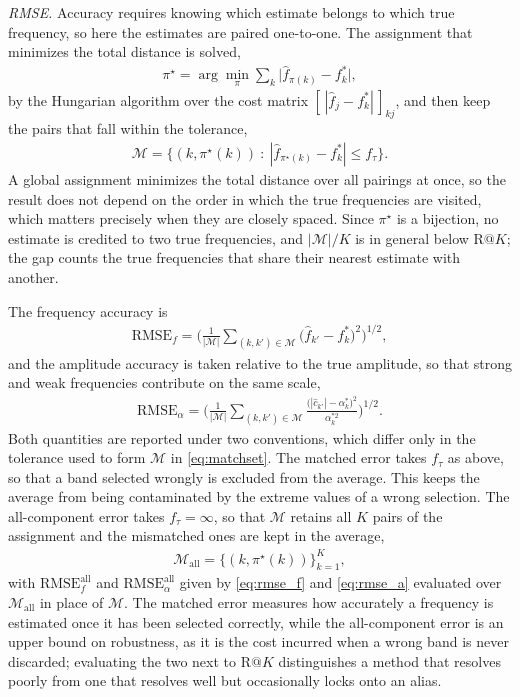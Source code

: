 \documentclass[journal,onecolumn]{IEEEtran}
\begin{document}
\emph{RMSE.} Accuracy requires knowing which estimate belongs to which true frequency, so here the estimates are paired one-to-one. The assignment that minimizes the total distance is solved,
\begin{eqnarray}
\label{eq:assign}
\pi^\star=\arg\min_{\pi}\sum_{k}\big|\hat f_{\pi(k)}-f_k^\ast\big|,
\end{eqnarray}
by the Hungarian algorithm over the cost matrix $[\,|\hat f_j-f_k^\ast|\,]_{kj}$, and then keep the pairs that fall within the tolerance,
\begin{eqnarray}
\label{eq:matchset}
\mathcal{M}=\big\{(k,\pi^\star(k))\ :\ |\hat f_{\pi^\star(k)}-f_k^\ast|\le f_{\tau}\big\}.
\end{eqnarray}
A global assignment minimizes the total distance over all pairings at once, so the result does not depend on the order in which the true frequencies are visited, which matters precisely when they are closely spaced. Since $\pi^\star$ is a bijection, no estimate is credited to two true frequencies, and $|\mathcal{M}|/K$ is in general below $\mathrm{R}@K$; the gap counts the true frequencies that share their nearest estimate with another.

The frequency accuracy is
\begin{eqnarray}
\label{eq:rmse_f}
\mathrm{RMSE}_f=\bigg(\frac{1}{|\mathcal{M}|}\sum_{(k,k')\in\mathcal{M}}\big(\hat f_{k'}-f^\ast_{k}\big)^2\bigg)^{1/2},
\end{eqnarray}
and the amplitude accuracy is taken relative to the true amplitude, so that strong and weak frequencies contribute on the same scale,
\begin{eqnarray}
\label{eq:rmse_a}
\mathrm{RMSE}_\alpha=\bigg(\frac{1}{|\mathcal{M}|}\sum_{(k,k')\in\mathcal{M}}\frac{\big(|\hat c_{k'}|-\alpha^\ast_{k}\big)^2}{\alpha_{k}^{\ast 2}}\bigg)^{1/2}.
\end{eqnarray}
Both quantities are reported under two conventions, which differ only in the tolerance used to form $\mathcal{M}$ in \eqref{eq:matchset}. The matched error takes $f_{\tau}$ as above, so that a band selected wrongly is excluded from the average. This keeps the average from being contaminated by the extreme values of a wrong selection. The all-component error takes $f_{\tau}=\infty$, so that $\mathcal{M}$ retains all $K$ pairs of the assignment and the mismatched ones are kept in the average,
\begin{eqnarray}
\label{eq:rmse_all}
\mathcal{M}_{\mathrm{all}}=\big\{(k,\pi^\star(k))\big\}_{k=1}^{K},
\end{eqnarray}
with $\mathrm{RMSE}_f^{\mathrm{all}}$ and $\mathrm{RMSE}_\alpha^{\mathrm{all}}$ given by \eqref{eq:rmse_f} and \eqref{eq:rmse_a} evaluated over $\mathcal{M}_{\mathrm{all}}$ in place of $\mathcal{M}$. The matched error measures how accurately a frequency is estimated once it has been selected correctly, while the all-component error is an upper bound on robustness, as it is the cost incurred when a wrong band is never discarded; evaluating the two next to $\mathrm{R}@K$ distinguishes a method that resolves poorly from one that resolves well but occasionally locks onto an alias.
\end{document}
